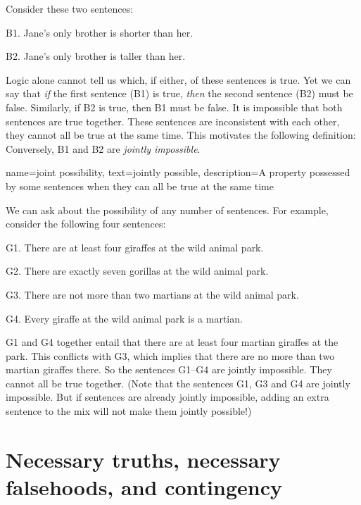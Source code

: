 Consider these two sentences:
	\begin{ebullet}
		\item[B1.] Jane's only brother is shorter than her.
		\item[B2.] Jane's only brother is taller than her.
	\end{ebullet}
Logic alone cannot tell us which, if either, of these sentences is true. Yet we can say that \emph{if} the first sentence (B1) is true, \emph{then} the second sentence (B2) must be false. Similarly, if B2 is true, then B1 must be false. It is impossible that both sentences are true together. These sentences are inconsistent with each other, they cannot all be true at the same time. This motivates the following definition:
Conversely, B1 and B2 are \emph{jointly impossible}.

{
name=joint possibility,
text={jointly possible},
description={A property possessed by some sentences when they can all be true at the same time}
}

We can ask about the possibility of any number of sentences. For example, consider the following four sentences:
	\begin{ebullet}	
		\item[G1.] \label{MartianGiraffes} There are at least four giraffes at the wild animal park.
		\item[G2.] There are exactly seven gorillas at the wild animal park.
		\item[G3.] There are not more than two martians at the wild animal park.
		\item[G4.] Every giraffe at the wild animal park is a martian.
	\end{ebullet}
G1 and G4 together entail that there are at least four martian giraffes at the park. This conflicts with G3, which implies that there are no more than two martian giraffes there. So the sentences G1--G4 are jointly impossible. They cannot all be true together. (Note that the sentences G1, G3 and G4 are jointly impossible. But if sentences are already jointly impossible, adding an extra sentence to the mix will not make them jointly possible!)

\section[Necessary truths, falsehoods, and contingency]{Necessary truths, necessary falsehoods, and contingency}

